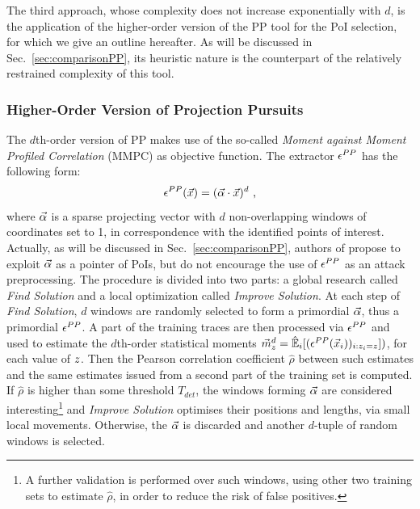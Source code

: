 The third approach, whose complexity does not increase exponentially with $d$, is the application of the higher-order version of the PP tool for the PoI selection, for which we give an outline hereafter. As will be discussed in Sec.~\ref{sec:comparisonPP}, its heuristic nature is the counterpart of the relatively restrained complexity of this tool. \\

%

\subsubsection{Higher-Order Version of Projection Pursuits}\label{sec:PP_description}
The $d$th-order version of PP makes use of the so-called \emph{Moment against Moment Profiled Correlation} (MMPC) as objective function. The extractor $\epsilon^{PP}$ has the following form:
\begin{equation} 
\epsilon^{PP}(\vec{x}) = (\vec{\alpha}\cdot\vec{x})^d \mbox{ ,}
\end{equation}
where $\vec{\alpha}$ is a sparse projecting vector with $d$ non-overlapping windows of coordinates set to 1, in correspondence with the identified points of interest. Actually, as will be discussed in Sec.~\ref{sec:comparisonPP}, authors of \cite{PP} propose to exploit $\vec{\alpha}$ as a pointer of PoIs, but do not encourage the use of $\epsilon^{PP}$ as an attack preprocessing. The procedure is divided into two parts: a global research called {\em Find Solution} and a local optimization called {\em Improve Solution}. At each step of {\em Find Solution}, $d$ windows are randomly selected to form a primordial $\vec{\alpha}$, thus a primordial $\epsilon^{PP}$. A part of the training traces are then processed via $\epsilon^{PP}$ and used to estimate the $d$th-order statistical moments $\vec{m}^d_z = \hat{\mathbb{E}}_i[(\epsilon^{PP}(\vec{x}_i))_{i:z_i=z}])$,  for each value of $z$. Then the Pearson correlation coefficient $\hat{\rho}$ between such estimates and the same estimates issued from a second part of the training set is computed. If $\hat{\rho}$ is higher than some threshold $T_{det}$, the windows forming $\vec{\alpha}$ are considered interesting\footnote{A further validation is performed over such windows, using other two training sets to estimate $\hat{\rho}$, in order to reduce the risk of false positives.}\label{fn:4trainingSets} and \emph{Improve Solution} optimises their positions and lengths, via small local movements. Otherwise, the $\vec{\alpha}$ is discarded and another $d$-tuple of random windows is selected.\\

